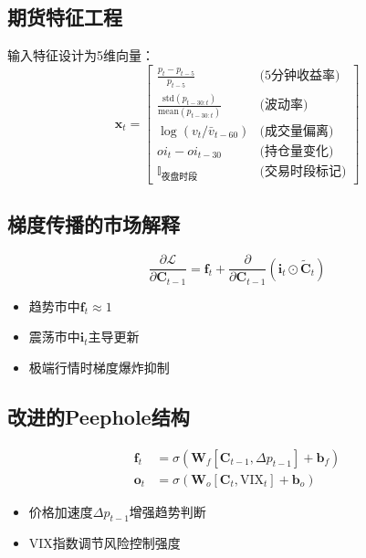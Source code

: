 \documentclass[a4paper,11pt]{ctexart}
\begin{document}
\subsection*{期货特征工程}
输入特征设计为5维向量：
\begin{equation*}
\mathbf{x}_t = \begin{bmatrix}
\frac{p_t - p_{t-5}}{p_{t-5}} & \text{(5分钟收益率)} \\
\frac{\text{std}(p_{t-30:t})}{\text{mean}(p_{t-30:t})} & \text{(波动率)} \\
\log(v_t/\bar{v}_{t-60}) & \text{(成交量偏离)} \\
oi_t - oi_{t-30} & \text{(持仓量变化)} \\
\mathbb{I}_{\text{夜盘时段}} & \text{(交易时段标记)}
\end{bmatrix}
\end{equation*}

\subsection*{梯度传播的市场解释}
\begin{minipage}[t]{0.6\linewidth}
\begin{equation*}
\frac{\partial \mathcal{L}}{\partial \mathbf{C}_{t-1}} = \mathbf{f}_t + \frac{\partial}{\partial \mathbf{C}_{t-1}}(\mathbf{i}_t \odot \tilde{\mathbf{C}}_t)
\end{equation*}
\end{minipage}
\begin{minipage}[t]{0.35\linewidth}
\begin{itemize}
\item 趋势市中$\mathbf{f}_t \approx 1$
\item 震荡市中$\mathbf{i}_t$主导更新
\item 极端行情时梯度爆炸抑制
\end{itemize}
\end{minipage}

\subsection*{改进的Peephole结构}
\begin{equation*}
\begin{aligned}
\mathbf{f}_t &= \sigma\left(\mathbf{W}_f[\mathbf{C}_{t-1}, \Delta p_{t-1}] + \mathbf{b}_f\right) \\
\mathbf{o}_t &= \sigma\left(\mathbf{W}_o[\mathbf{C}_t, \text{VIX}_t] + \mathbf{b}_o\right)
\end{aligned}
\end{equation*}
\begin{itemize}
\item 价格加速度$\Delta p_{t-1}$增强趋势判断
\item VIX指数调节风险控制强度
\end{itemize}
\end{document}

